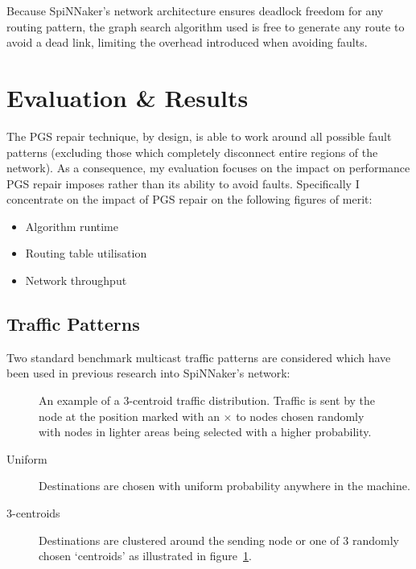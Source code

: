 		Because SpiNNaker's network architecture ensures deadlock freedom for any
		routing pattern, the graph search algorithm used is free to generate any
		route to avoid a dead link, limiting the overhead introduced when avoiding
		faults.
		
	\section{Evaluation \& Results}
		
		\label{sec:routing-evaluation}
		
		The PGS repair technique, by design, is able to work around all possible
		fault patterns (excluding those which completely disconnect entire regions
		of the network). As a consequence, my evaluation focuses on the impact on
		performance PGS repair imposes rather than its ability to avoid faults.
		Specifically I concentrate on the impact of PGS repair on the following
		figures of merit:
		
		\begin{itemize}
			\item Algorithm runtime
			\item Routing table utilisation
			\item Network throughput
		\end{itemize}
		
		\subsection{Traffic Patterns}
			
			Two standard benchmark multicast traffic patterns are considered which
			have been used in previous research into SpiNNaker's network:
			
			\begin{figure}
				\center
				
				\caption[An example of a 3-centroid traffic distribution.]%
				{An example of a 3-centroid traffic distribution. Traffic is
				sent by the node at the position marked with an {\color{red}$\times$}
				to nodes chosen randomly with nodes in lighter areas being selected
				with a higher probability.}
				\label{fig:traffic-distribution-centroids}
			\end{figure}
			
			\begin{description}
				
				\item[Uniform] Destinations are chosen with uniform probability
				anywhere in the machine.
				
				\item[3-centroids] Destinations are clustered around the sending node
				or one of 3 randomly chosen `centroids' as illustrated in
				figure~\ref{fig:traffic-distribution-centroids}.
				
			\end{description}
			
